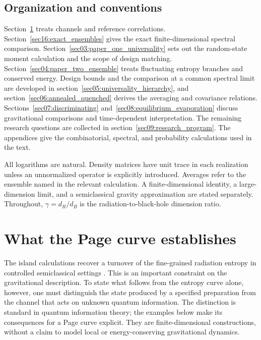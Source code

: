 \documentclass[11pt,letterpaper]{article}
\theoremstyle{plain}
\theoremstyle{definition}
\theoremstyle{remark}
\begin{document}
\subsection{Organization and conventions}

Section~\ref{sec02:page_curve_establishes} treats channels and
reference correlations. Section~\ref{sec16:exact_ensembles} gives the
exact finite-dimensional spectral comparison.
Section~\ref{sec03:paper_one_universality}
sets out the random-state moment calculation and the scope of design
matching. Section~\ref{sec04:paper_two_ensemble} treats fluctuating
entropy branches and conserved energy. Design bounds and the comparison at a common spectral limit
are developed in section~\ref{sec05:universality_hierarchy}, and
section~\ref{sec06:annealed_quenched} derives the averaging and
covariance relations. Sections~\ref{sec07:discriminating}
and~\ref{sec08:equilibrium_evaporation} discuss gravitational
comparisons and time-dependent interpretation. The remaining research
questions are collected in section~\ref{sec09:research_program}.
The appendices give the combinatorial, spectral, and probability
calculations used in the text.

All logarithms are natural. Density matrices have unit trace in each
realization unless an unnormalized operator is explicitly introduced.
Averages refer to the ensemble named in the relevant calculation.
A finite-dimensional identity, a large-dimension limit, and a
semiclassical gravity approximation are stated separately. Throughout,
$\gamma=d_R/d_B$ is the radiation-to-black-hole dimension ratio.

\section{What the Page curve establishes}
\label{sec02:page_curve_establishes}

The island calculations recover a turnover of the fine-grained radiation
entropy in controlled semiclassical settings
\citep{penington2020,almheirietal2019,almheirietal2020page,pssyetal2022}.
This is an important constraint on the gravitational description. To state
what follows from the entropy curve alone, however, one must distinguish
the state produced by a specified preparation from the channel that acts
on unknown quantum information. The distinction is standard in quantum
information theory; the examples below make its consequences for a Page
curve explicit. They are finite-dimensional constructions, without a
claim to model local or energy-conserving gravitational dynamics.
\end{document}
